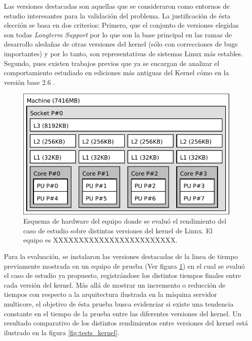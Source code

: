 Las versiones destacadas son aquellas que se consideraron como entornos de estudio interesantes para la validación del problema. La justificación de ésta elección se basa en dos criterios: Primero, que el conjunto de versiones elegidas son todas \emph{Longterm Support} por lo que son la base principal en las ramas de desarrollo aledañas de otras versiones del kernel (sólo con correcciones de bugs importantes) y por lo tanto, son representativas de sistemas Linux más estables. Segundo, pues existen trabajos previos que ya se encargan de analizar el comportamiento estudiado en ediciones más antiguas del Kernel cómo en la versión base 2.6 \cite{tesis:diegoDCC}.

\begin{figure}[h!]
	\centering
	\includegraphics[scale=0.6]{imagenes/desktopkernelpc.pdf}
	\caption{Esquema de hardware del equipo donde se evaluó el rendimiento del caso de estudio sobre distintas versiones del kernel de Linux. El equipo es XXXXXXXXXXXXXXXXXXXXXXXX.}
	\label{fig:desktop_kernel_pc}
\end{figure}

Para la evaluación, se instalaron las versiones destacadas de la linea de tiempo previamente mostrada en un equipo de prueba (Ver figura \ref{fig:desktop_kernel_pc}) en el cual se evaluó el caso de estudio ya propuesto, registrándose los distintos tiempos finales entre cada versión del kernel. Más allá de mostrar un incremento o reducción de tiempos con respecto a la arquitectura ilustrada en la máquina servidor multicore, el objetivo de ésta prueba busca evidenciar si existe una tendencia constante en el tiempo de la prueba entre las diferentes versiones del kernel. Un resultado comparativo de los distintos rendimientos entre versiones del kernel está ilustrado en la figura \ref{fig:tests_kernel}.

